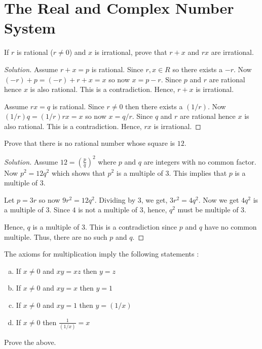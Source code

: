 

\chapter{The Real and Complex Number System}

\bigbreak

\begin{prblm}
    If $r$ is rational ($r \neq 0$) and $x$ is irrational, prove that $r + x$ and $rx$ are irrational.
\end{prblm}

\begin{proof}[Solution]
    Assume $r + x = p$ is rational. Since $r, x \in R$ so there exists a $-r$. 
    Now $(-r) + p = (-r) + r + x = x$ so now $x = p - r$. Since $p$ and $r$ are rational hence $x$ is also rational.
    This is a contradiction. Hence, $r + x$ is irrational.

    Assume $rx = q$ is rational. Since $r \neq 0$ then there exists a $(1/r)$.
    Now $(1/r)q = (1/r)rx = x$ so now $x = q/r$. Since $q$ and $r$ are rational hence $x$ is also rational.
    This is a contradiction. Hence, $rx$ is irrational.
\end{proof}

\begin{prblm}
    Prove that there is no rational number whose square is $12$.
\end{prblm}

\begin{proof}[Solution]
    Assume $12 = \left( \frac{p}{q} \right)^2$ where $p$ and $q$ are integers with no common factor.
    Now $p^2 = 12q^2$ which shows that $p^2$ is a multiple of $3$. 
    This implies that $p$ is a multiple of $3$. 
    
    Let $p = 3r$ so now $9r^2 = 12q^2$.
    Dividing by $3$, we get, $3r^2 = 4q^2$. Now we get $4q^2$ is a multiple of $3$.
    Since $4$ is not a multiple of $3$, hence, $q^2$ must be multiple of $3$. 
    
    Hence, $q$ is a multiple of $3$. This is a contradiction since $p$ and $q$ have no common multiple.
    Thus, there are no such $p$ and $q$.

\end{proof}

\begin{prblm}
    The axioms for multiplication imply the following statements : 
    \begin{enumerate}[a)]
        \item If $x \neq 0$ and $xy = xz$  then $y = z$
        \item If $x \neq 0$ and $xy = x$ then $y = 1$
        \item If $x \neq 0$ and $xy = 1$ then $y = (1/x)$
        \item If $x \neq 0$ then $\frac{1}{(1/x)}= x$
    \end{enumerate}
    Prove the above.
\end{prblm}

